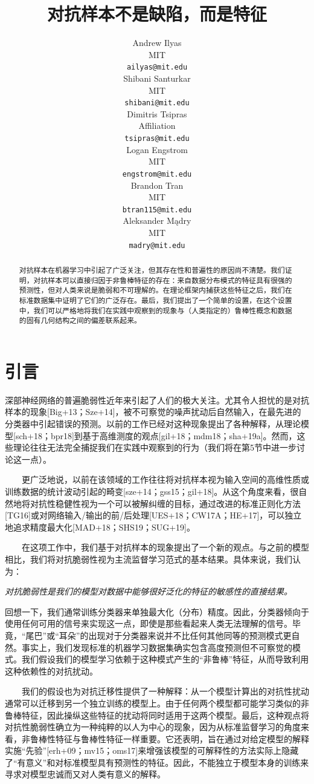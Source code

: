 \documentclass{article}
\title{对抗样本不是缺陷，而是特征}
\author{%
  Andrew Ilyas \\
  MIT\\
  \texttt{ailyas@mit.edu} \\
  \And
  Shibani Santurkar \\
  MIT \\
  \texttt{shibani@mit.edu} \\
  \And
  Dimitris Tsipras \\
  Affiliation \\
  \texttt{tsipras@mit.edu} \\
  \AND
  Logan Engstrom \\
  MIT \\
  \texttt{engstrom@mit.edu} \\
  \And
  Brandon Tran \\
  MIT \\
  \texttt{btran115@mit.edu} \\
  \And
  Aleksander Mądry \\
  MIT \\
  \texttt{madry@mit.edu} \\
}
\begin{document}

\maketitle
\begin{abstract}
  对抗样本在机器学习中引起了广泛关注，但其存在性和普遍性的原因尚不清楚。我们证明，对抗样本可以直接归因于非鲁棒特征的存在：来自数据分布模式的特征具有很强的预测性，但对人类来说是脆弱和不可理解的。在理论框架内捕获这些特征之后，我们在标准数据集中证明了它们的广泛存在。最后，我们提出了一个简单的设置，在这个设置中，我们可以严格地将我们在实践中观察到的现象与（人类指定的）鲁棒性概念和数据的固有几何结构之间的偏差联系起来。
\end{abstract}

\section{引言}

深部神经网络的普遍脆弱性近年来引起了人们的极大关注。尤其令人担忧的是对抗样本的现象[Big+13；Sze+14]，被不可察觉的噪声扰动后自然输入，在最先进的分类器中引起错误的预测。以前的工作已经对这种现象提出了各种解释，从理论模型[sch+18；bpr18]到基于高维测度的观点[gil+18；mdm18；sha+19a]。然而，这些理论往往无法完全捕捉我们在实践中观察到的行为（我们将在第5节中进一步讨论这一点）。

\ \ \ \ 更广泛地说，以前在该领域的工作往往将对抗样本视为输入空间的高维性质或训练数据的统计波动引起的畸变[sze+14；gss15；gil+18]。从这个角度来看，很自然地将对抗性稳健性视为一个可以被解纠缠的目标，通过改进的标准正则化方法[TG16]或对网络输入/输出的前/后处理[UES+18；CW17A；HE+17]，可以独立地追求精度最大化[MAD+18；SHS19；SUG+19]。

\ \ \ \ 在这项工作中，我们基于对抗样本的现象提出了一个新的观点。与之前的模型相比，我们将对抗脆弱性视为主流监督学习范式的基本结果。具体来说，我们认为：
\begin{center}
  \textit{对抗脆弱性是我们的模型对数据中能够很好泛化的特征的敏感性的直接结果。}
\end{center}
回想一下，我们通常训练分类器来单独最大化（分布）精度。因此，分类器倾向于使用任何可用的信号来实现这一点，即使是那些看起来人类无法理解的信号。毕竟，“尾巴”或“耳朵”的出现对于分类器来说并不比任何其他同等的预测模式更自然。事实上，我们发现标准的机器学习数据集确实包含高度预测但不可察觉的模式。我们假设我们的模型学习依赖于这种模式产生的“非鲁棒”特征，从而导致利用这种依赖性的对抗扰动。

\ \ \ \ 我们的假设也为对抗迁移性提供了一种解释：从一个模型计算出的对抗性扰动通常可以迁移到另一个独立训练的模型上。由于任何两个模型都可能学习类似的非鲁棒特征，因此操纵这些特征的扰动将同时适用于这两个模型。最后，这种观点将对抗性脆弱性确立为一种纯粹的以人为中心的现象，因为从标准监督学习的角度来看，非鲁棒性特征与鲁棒性特征一样重要。它还表明，旨在通过对给定模型的解释实施“先验”[erh+09；mv15；oms17]来增强该模型的可解释性的方法实际上隐藏了“有意义”和对标准模型具有预测性的特征。因此，不能独立于模型本身的训练来寻求对模型忠诚而又对人类有意义的解释。
\end{document}
